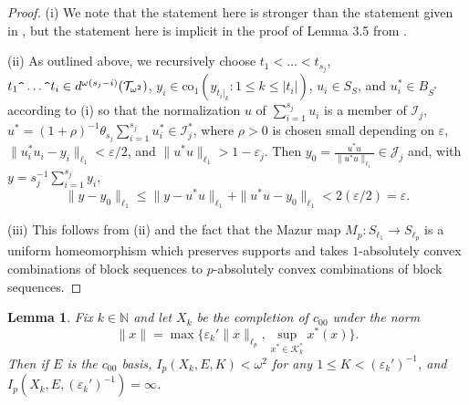 \documentclass[12pt]{amsart}
\newtheorem{lemma}[theorem]{Lemma}
\theoremstyle{definition}
\newcommand{\nn}{\mathbb{N}}
\newcommand{\kkk}{\mathcal{K}}
\newcommand{\ttt}{\mathcal{T}}
\newcommand{\iii}{\mathcal{I}}
\newcommand{\jjj}{\mathcal{J}}
\begin{document}
\begin{proof}(i)  We note that the statement here is stronger than the statement given in \cite{OS}, but the statement here is implicit in the proof of Lemma 3.5 from \cite{OS}.  

(ii) As outlined above, we recursively choose $t_1<\ldots < t_{s_j}$, $t_1\verb!^!\ldots \verb!^!t_i\in d^{\omega(s_j-i)}(\ttt_{\omega^2})$, $y_i\in \text{co}_1(y_{t_i|_k}:1\leqslant k\leqslant |t_i|)$, $u_i\in S_S$, and $u_i^*\in B_{S^*}$ according to (i) so that the normalization $u$ of $\sum_{i=1}^{s_j} u_i$ is a member of $\iii_j$, $u^*=(1+\rho)^{-1}\theta_{s_j}\sum_{i=1}^{s_j} u_i^*\in \iii^*_j$, where $\rho>0$ is chosen small depending on $\varepsilon$, $\|u^*_iu_i- y_i\|_{\ell_1}< \varepsilon/2$, and $\|u^*u\|_{\ell_1}> 1-\varepsilon_j$.  Then $y_0=\frac{u^*u}{\|u^*u\|_{\ell_1}}\in \jjj_j$ and, with $y=s_j^{-1}\sum_{i=1}^{s_j} y_i$, $$\|y- y_0\|_{\ell_1}\leqslant \|y - u^*u\|_{\ell_1} + \|u^*u - y_0\|_{\ell_1} < 2(\varepsilon/2)= \varepsilon.$$  



(iii) This follows from (ii) and the fact that the Mazur map $M_p:S_{\ell_1}\to S_{\ell_p}$ is a uniform homeomorphism which preserves supports and takes $1$-absolutely convex combinations of block sequences to $p$-absolutely convex combinations of block sequences.  




\end{proof}



\begin{lemma} Fix $k\in \nn$ and let $X_k$ be the completion of $c_{00}$ under the norm $$\|x\|=\max \{\varepsilon_k' \|x\|_{\ell_p}, \sup_{x^*\in \kkk_k^*} x^*(x)\}.$$  Then if $E$ is the $c_{00}$ basis, $I_p(X_k,E, K)< \omega^2$ for any $1\leqslant K<(\varepsilon_k')^{-1}$, and $I_p(X_k, E, (\varepsilon_k')^{-1})=\infty$.



\label{andy daly}
\end{lemma}
\end{document}
